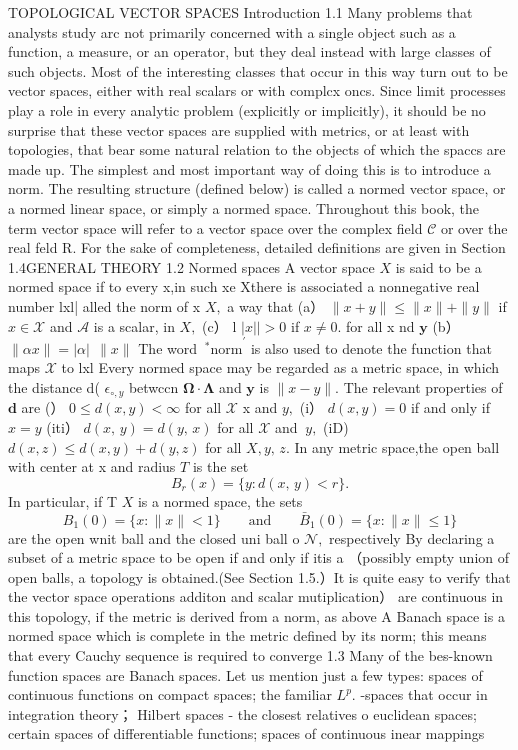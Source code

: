 TOPOLOGICAL VECTOR SPACES Introduction 1.1 Many problems that analysts study arc not primarily concerned with a single object such as a function, a measure, or an operator, but they deal instead with large classes of such objects. Most of the interesting classes that occur in this way turn out to be vector spaces, either with real scalars or with complcx oncs. Since limit processes play a role in every analytic problem (explicitly or implicitly), it should be no surprise that these vector spaces are supplied with metrics, or at least with topologies, that bear some natural relation to the objects of which the spaccs are made up. The simplest and most important way of doing this is to introduce a norm. The resulting structure (defined below) is called a normed vector space, or a normed linear space, or simply a normed space. Throughout this book, the term vector space will refer to a vector space over the complex field $\textstyle{\mathcal{C}}$ or over the real feld R. For the sake of completeness, detailed definitions are given in Section 1.4GENERAL THEORY 1.2 Normed spaces A vector space $\textstyle X$ is said to be a normed space if to every x,in such xe Xthere is associated a nonnegative real number lxl| alled the norm of x $X,$ a way that (a） $\|x+y\|\leq\|x\|+\|y\|$ if $x\in{\mathcal{X}}$ and $\textstyle{\mathcal{A}}$ is a scalar, in $X,$ (c） l $|x||>0$ if $x\neq0.$ for all x nd $\boldsymbol{y}$ (b） $\|\alpha x\|=|\alpha|\ \ \|x\|$ The word $\mathrm{\mathrm{}~^{*}n o r m}^{\prime}$ is also used to denote the function that maps $\scriptstyle{\mathcal{X}}$ to lxl Every normed space may be regarded as a metric space, in which the distance d( $\scriptstyle{\epsilon_{\circ,y}}$ betwccn $\mathbf{\Omega}\cdot{\boldsymbol{\Lambda}}$ and $\mathbf{y}$ is $\|x-y\|.$ The relevant properties of ${\boldsymbol{d}}$ are (） $0\leq d(x,y)<\infty$ for all $\textstyle{\mathcal{X}}$ x and ${\mathit{y}},$ (i） $d(x,y)=0$ if and only if $x=y$ (iti） $d(x,\,y)=d(y,\,x)$ for all $\scriptstyle{\mathcal{X}}$ and ${\ {\mathit{y}}},$ (iD) $d(x,z)\leq d(x,y)+d(y,z)$ for all $X,y,\,z.$ In any metric space,the open ball with center at x and radius ${\mathbf{}}T$ is the set $$ B_{r}(x)=\{y\colon d(x,\,y)<r\}. $$ In particular, if T $\textstyle X$ is a normed space, the sets $$ B_{1}(0)=\{x:\|x\|<1\}\qquad{\mathrm{and}}\qquad{\bar{B}}_{1}(0)=\{x:\|x\|\leq1\} $$ are the open wnit ball and the closed uni ball o ${\mathcal{N}},$ respectively By declaring a subset of a metric space to be open if and only if itis a （possibly empty union of open balls, a topology is obtained.(See Section 1.5.）It is quite easy to verify that the vector space operations additon and scalar mutiplication） are continuous in this topology, if the metric is derived from a norm, as above A Banach space is a normed space which is complete in the metric defined by its norm; this means that every Cauchy sequence is required to converge 1.3 Many of the bes-known function spaces are Banach spaces. Let us mention just a few types: spaces of continuous functions on compact spaces; the familiar $L^{p}.$ -spaces that occur in integration theory； Hilbert spaces - the closest relatives o euclidean spaces; certain spaces of differentiable functions; spaces of continuous inear mappings 